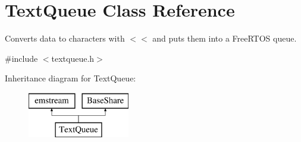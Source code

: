 \hypertarget{class_text_queue}{}\section{Text\+Queue Class Reference}
\label{class_text_queue}


Converts data to characters with {\ttfamily $<$$<$} and puts them into a Free\+R\+T\+OS queue.  




{\ttfamily \#include $<$textqueue.\+h$>$}

Inheritance diagram for Text\+Queue\+:\begin{figure}[H]
\begin{center}
\leavevmode
\includegraphics[height=2.000000cm]{class_text_queue}
\end{center}
\end{figure}
